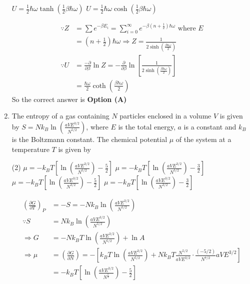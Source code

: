 \begin{enumerate}
\begin{tasks}
		\task[\textbf{C.}] $U=\frac{1}{2} \hbar \omega \tanh \left(\frac{1}{2} \beta \hbar \omega\right)$
		\task[\textbf{D.}] $U=\frac{1}{2} \hbar \omega \cosh \left(\frac{1}{2} \beta \hbar \omega\right)$
	\end{tasks}
	\begin{answer}
		\begin{align*}
		\because Z&=\sum e^{-\beta E_{i}}=\sum_{i=0}^{\infty} e^{-\beta\left(n+\frac{1}{2}\right) \hbar \omega}\text{ where }E\\&=\left(n+\frac{1}{2}\right) \hbar \omega \Rightarrow Z=\frac{1}{2 \sinh \left(\frac{\beta \hbar \omega}{2}\right)}\\
		\because U&=\frac{-\partial}{\partial \beta} \ln Z=-\frac{\partial}{\partial \beta} \ln \left[\frac{1}{2 \sinh \left(\frac{\beta \hbar \omega}{2}\right)}\right]\\&=\frac{\hbar \omega}{2} \operatorname{coth}\left(\frac{\beta \hbar \omega}{2}\right)
		\end{align*}
		So the correct answer is \textbf{Option (A)}
	\end{answer}	
	\item  The entropy of a gas containing $N$ particles enclosed in a volume $V$ is given by $S=N k_{B} \ln \left(\frac{a V E^{3 / 2}}{N^{5 / 2}}\right)$, where $E$ is the total energy, $a$ is a constant and $k_{B}$ is the Boltzmann constant. The chemical potential $\mu$ of the system at a temperature $T$ is given by
	{}
	\begin{tasks}(2)
		\task[\textbf{A.}] $\mu=-k_{B} T\left[\ln \left(\frac{a V E^{3 / 2}}{N^{5 / 2}}\right)-\frac{5}{2}\right]$
		\task[\textbf{B.}] $\mu=-k_{B} T\left[\ln \left(\frac{a V E^{3 / 2}}{N^{5 / 2}}\right)-\frac{3}{2}\right]$
		\task[\textbf{C.}] $\mu=-k_{B} T\left[\ln \left(\frac{a V E^{3 / 2}}{N^{3 / 2}}\right)-\frac{5}{2}\right]$
		\task[\textbf{D.}] $\mu=-k_{B} T\left[\ln \left(\frac{a V E^{3 / 2}}{N^{3 / 2}}\right)-\frac{3}{2}\right]$
	\end{tasks}
	\begin{answer}
		\begin{align*}
		\left(\frac{\partial G}{\partial T}\right)_{P}&=-S=-N k_{B} \ln \left(\frac{a V E^{3 / 2}}{N^{5 / 2}}\right)\\ \because S&=N k_{B} \ln \left(\frac{a V E^{3 / 2}}{N^{5 / 2}}\right)\\
		\Rightarrow G&=-N k_{B} T \ln \left(\frac{a V E^{3 / 2}}{N^{5 / 2}}\right)+\ln A\\
		\Rightarrow \mu&=\left(\frac{\partial G}{\partial N}\right)=-\left[k_{B} T \ln \left(\frac{a V E^{3 / 2}}{N^{5 / 2}}\right)+N k_{B} T \frac{N^{5 / 2}}{a V E^{3 / 2}} \cdot \frac{(-5 / 2)}{N^{7 / 2}} a V E^{3 / 2}\right]\\&=-k_{B} T\left[\ln \left(\frac{a V E^{3 / 2}}{N^{\frac{5}{2}}}\right)-\frac{5}{2}\right]

\end{align*}
\end{answer}
\end{enumerate}
